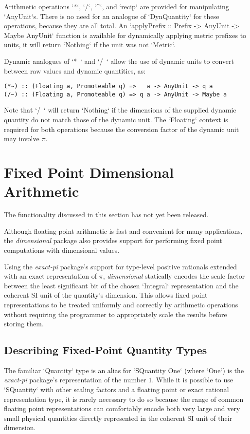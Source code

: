 \documentclass[11pt]{report}
\newcommand{\packagename}[1]{\textit{#1}}
\newcommand{\thispackage}{\packagename{dimensional}}
\newcommand{\prerelease}{\begin{framed}
The functionality discussed in this section has not yet been released.
\end{framed}}
\begin{document}
Arithmetic operations `*`, `/`, `^`, and `recip` are provided for manipulating `AnyUnit`s. There is no need for an analogue
of `DynQuantity` for these operations, because they are all total. An `applyPrefix :: Prefix -> AnyUnit -> Maybe AnyUnit`
function is available for dynamically applying metric prefixes to units, it will return `Nothing` if the unit was not `Metric`.

Dynamic analogues of `*~` and `/~` allow the use of dynamic units to convert between raw values and dynamic quantities, as:

\begin{lstlisting}
(*~) :: (Floating a, Promoteable q) =>   a -> AnyUnit -> q a
(/~) :: (Floating a, Promoteable q) => q a -> AnyUnit -> Maybe a
\end{lstlisting}

Note that `/~` will return `Nothing` if the dimensions of the supplied dynamic quantity do not match those of the
dynamic unit. The `Floating` context is required for both operations because the conversion factor of the
dynamic unit may involve $ \pi $.



\chapter{Fixed Point Dimensional Arithmetic}

\prerelease{}

Although floating point arithmetic is fast and convenient for many applications, the \thispackage{} package also provides
support for performing fixed point computations with dimensional values.

Using the \packagename{exact-pi} package's support for type-level positive rationals extended with an exact representation
of $ \pi $, \thispackage{} statically encodes the scale factor between the least significant bit of the chosen `Integral`
representation and the coherent SI unit of the quantity's dimension. This allows fixed point representations to be
treated uniformly and correctly by arithmetic operations without requiring the programmer to appropriately scale the results
before storing them.

\section{Describing Fixed-Point Quantity Types}

The familiar `Quantity` type is an alias for `SQuantity One` (where `One`) is the \packagename{exact-pi}
package's representation of the number $ 1 $. While it is possible to use `SQuantity` with other scaling factors and a
floating point or exact rational representation type, it is rarely necessary to do so because the range of common floating
point representations can comfortably encode both very large and very small physical quantities directly represented in the
coherent SI unit of their dimension.
\end{document}
